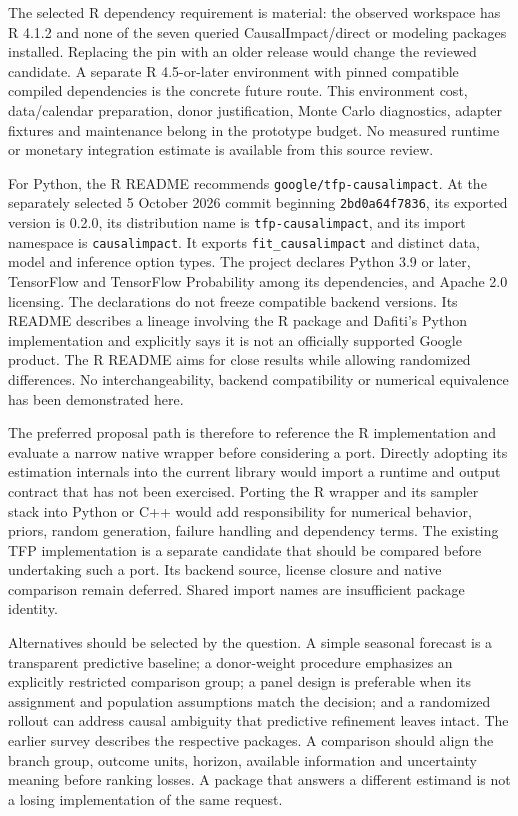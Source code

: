 The selected R dependency requirement is material: the observed workspace
has R 4.1.2 and none of the seven queried CausalImpact/direct or modeling
packages installed. Replacing the pin with an older release would change
the reviewed candidate. A separate R 4.5-or-later environment with pinned
compatible compiled dependencies is the concrete future route. This
environment cost, data/calendar preparation, donor justification, Monte
Carlo diagnostics, adapter fixtures and maintenance belong in the prototype
budget. No measured runtime or monetary integration estimate is available
from this source review.\cite{exec13_ci_reuse,exec13_ci_dependencies}

For Python, the R README recommends \texttt{google/tfp-causalimpact}.
At the separately selected 5 October 2026 commit beginning
\texttt{2bd0a64f7836}, its exported version is 0.2.0, its distribution name
is \texttt{tfp-causalimpact}, and its import namespace is
\texttt{causalimpact}. It exports \texttt{fit\_causalimpact} and distinct
data, model and inference option types. The project declares Python 3.9 or
later, TensorFlow and TensorFlow Probability among its dependencies, and
Apache 2.0 licensing. The declarations do not freeze compatible backend
versions. Its README describes a lineage involving the R package and Dafiti's
Python implementation and explicitly says it is not an officially supported
Google product. The R README aims for close results while allowing
randomized differences. No interchangeability, backend compatibility or
numerical equivalence has been demonstrated here.
\cite{exec13_ci_python,exec13_ci_r}

The preferred proposal path is therefore to reference the R implementation
and evaluate a narrow native wrapper before considering a port. Directly
adopting its estimation internals into the current library would import a
runtime and output contract that has not been exercised. Porting the R
wrapper and its sampler stack into Python or C++ would add responsibility
for numerical behavior, priors, random generation, failure handling and
dependency terms. The existing TFP implementation is a separate candidate
that should be compared before undertaking such a port. Its backend source,
license closure and native comparison remain deferred. Shared import names
are insufficient package identity.\cite{exec13_ci_reuse,exec13_ci_python}

Alternatives should be selected by the question. A simple seasonal forecast
is a transparent predictive baseline; a donor-weight procedure emphasizes
an explicitly restricted comparison group; a panel design is preferable
when its assignment and population assumptions match the decision; and a
randomized rollout can address causal ambiguity that predictive refinement
leaves intact. The earlier survey describes the respective packages. A
comparison should align the branch group, outcome units, horizon, available
information and uncertainty meaning before ranking losses. A package that
answers a different estimand is not a losing implementation of the same
request.


